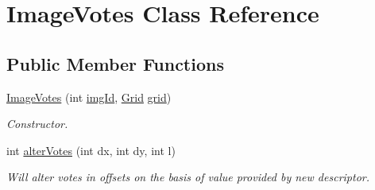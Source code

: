 \hypertarget{classImageVotes}{\section{\-Image\-Votes \-Class \-Reference}
\label{classImageVotes}
}
\subsection*{\-Public \-Member \-Functions}
\begin{DoxyCompactItemize}
\item 
\hypertarget{classImageVotes_ad4607ac8f62f3fcf496b4a121a00ee4a}{\hyperlink{classImageVotes_ad4607ac8f62f3fcf496b4a121a00ee4a}{\-Image\-Votes} (int \hyperlink{classImageVotes_ae5270d0d4b6f9ae069b3cb926bd29c0e}{img\-Id}, \hyperlink{classGrid}{\-Grid} \hyperlink{classImageVotes_a244e45706478d62a53b13db049b47b52}{grid})}\label{classImageVotes_ad4607ac8f62f3fcf496b4a121a00ee4a}

\begin{DoxyCompactList}\small\item\em \-Constructor. \end{DoxyCompactList}\item 
int \hyperlink{classImageVotes_a33a05976df28dc7b8ab46e5d3e3f6dd5}{alter\-Votes} (int dx, int dy, int l)
\begin{DoxyCompactList}\small\item\em \-Will alter votes in offsets on the basis of value provided by new descriptor. \end{DoxyCompactList}\end{DoxyCompactItemize}
